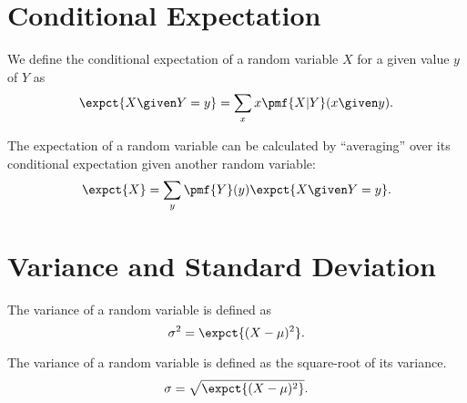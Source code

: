 \section{Conditional Expectation}
\label{sec:probability::expectation::conditional-expectation}

\begin{cluster}
\label{grp:def:probability::expectation::conditional-expectation}

\begin{definition}
\label{def:probability::expectation::conditional-expectation}
We define the conditional expectation of a random variable $X$ for a
given value $y$ of $Y$ as 
\[
\expct{X \given Y = y} = \sum_{x}{x \pmf{X | Y}(x \given y)}.
\]

\end{definition}
\end{cluster}

\begin{cluster}
\label{grp:thm:probability::expectation::tet}

\begin{theorem}
\label{thm:probability::expectation::tet}
The expectation of a random variable can be calculated by
``averaging'' over its conditional expectation given another random
variable:
\[
\expct{X} = \sum_{y}{\pmf{Y}(y) \expct{X \given Y = y}}.
\]

\end{theorem}
\end{cluster}


\section{Variance and Standard Deviation}
\label{sec:probability::expectation::variance-and-standard-deviation}

\begin{cluster}
\label{grp:def:probability::variance}

\begin{definition}[Variance]
\label{def:probability::variance}
The variance of a random variable is defined as 
\[
\sigma^2 = \expct{(X - \mu)^2}.
\]

\end{definition}
\end{cluster}

\begin{cluster}
\label{grp:def:probability::standard-deviation}

\begin{definition}
\label{def:probability::standard-deviation}
The variance of a random variable is defined as the square-root of its variance.
\[
\sigma = \sqrt{\expct{(X - \mu)^2}}.
\]

\end{definition}
\end{cluster}


